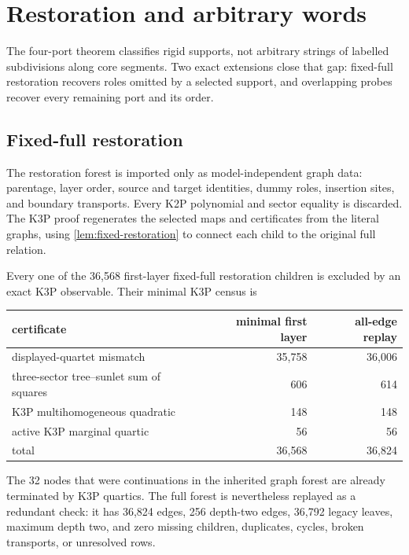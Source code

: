 \section{Restoration and arbitrary words}\label{sec:restoration}

The four-port theorem classifies rigid supports, not arbitrary strings of
labelled subdivisions along core segments.  Two exact extensions close that
gap: fixed-full restoration recovers roles omitted by a selected support, and
overlapping probes recover every remaining port and its order.

\subsection{Fixed-full restoration}

The restoration forest is imported only as model-independent graph data:
parentage, layer order, source and target identities, dummy roles, insertion
sites, and boundary transports.  Every K2P polynomial and sector equality is
discarded.  The K3P proof regenerates the selected maps and certificates from
the literal graphs, using \cref{lem:fixed-restoration} to connect each child
to the original full relation.

\begin{proposition}\label{prop:restoration}
Every one of the 36,568 first-layer fixed-full restoration children is
excluded by an exact K3P observable.  Their minimal K3P census is

\begin{center}
\begin{tabular}{lrr}
\toprule
certificate & minimal first layer & all-edge replay\\
\midrule
displayed-quartet mismatch & 35,758 & 36,006\\
three-sector tree--sunlet sum of squares & 606 & 614\\
K3P multihomogeneous quadratic & 148 & 148\\
active K3P marginal quartic & 56 & 56\\
\midrule
total & 36,568 & 36,824\\
\bottomrule
\end{tabular}
\end{center}

The 32 nodes that were continuations in the inherited graph forest are
already terminated by K3P quartics.  The full forest is nevertheless replayed
as a redundant check: it has 36,824 edges, 256 depth-two edges,
36,792 legacy leaves, maximum depth two, and zero missing children,
duplicates, cycles, broken transports, or unresolved rows.
\end{proposition}

